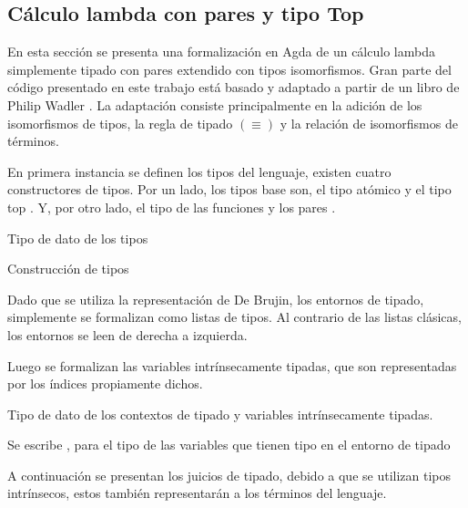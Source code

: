 \subsection{Cálculo lambda con pares y tipo Top}

En esta sección se presenta una formalización en Agda de un cálculo lambda simplemente tipado con pares extendido con tipos isomorfismos.
Gran parte del código presentado en este trabajo está basado y adaptado a partir de un libro de Philip Wadler \cite{plfa}.
La adaptación consiste principalmente en la adición de los isomorfismos de tipos, la regla de tipado $(\equiv)$ y la relación de isomorfismos de términos.

En primera instancia se definen los tipos del lenguaje, existen cuatro constructores de tipos.
Por un lado, los tipos base son, el tipo atómico \const{$\tau$} y el tipo top \const{$\top$}.
Y, por otro lado, el tipo de las funciones \const{$\_\Rightarrow\_$} y los pares \const{$\_\times\_$}.

\begin{codigo}
	Tipo de dato de los tipos
	
\end{codigo}

\begin{example}
	Construcción de tipos
\end{example}

Dado que se utiliza la representación de De Brujin, los entornos de tipado, simplemente se formalizan como listas de tipos.
Al contrario de las listas clásicas, los entornos se leen de derecha a izquierda.

Luego se formalizan las variables intrínsecamente tipadas, que son representadas por los índices propiamente dichos.

\begin{codigo}
	Tipo de dato de los contextos de tipado y variables intrínsecamente tipadas.
\end{codigo}

\begin{example}
	Se escribe \bound{$\Gamma$} \const{$\ni$} , para el tipo de las variables que tienen tipo  en el entorno de tipado \bound{$\Gamma$}
\end{example}

A continuación se presentan los juicios de tipado, debido a que se utilizan tipos intrínsecos, estos también representarán a los términos del lenguaje.

